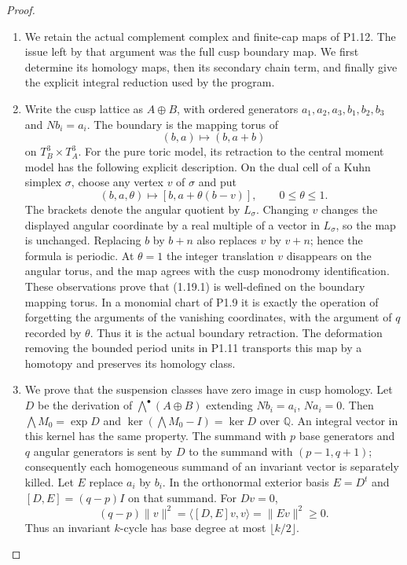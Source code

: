 \begin{proof}
\begin{enumerate}[label=\arabic*.]
\item We retain the actual complement complex and finite-cap maps of P1.12.
The issue left by that argument was the full cusp boundary map.
We first determine its homology maps, then its secondary chain term,
and finally give the explicit integral reduction used by the program.

\item Write the cusp lattice as $A\oplus B$, with ordered generators
$a_1,a_2,a_3,b_1,b_2,b_3$ and $Nb_i=a_i$.
The boundary is the mapping torus of
\[
 (b,a)\longmapsto(b,a+b)
\]
on $T_B^3\times T_A^3$.
For the pure toric model, its retraction to the central moment model
has the following explicit description.  On the dual cell of a Kuhn
simplex $\sigma$, choose any vertex $v$ of $\sigma$ and put
\[
 (b,a,\theta)\longmapsto
   [b,a+\theta(b-v)],\qquad0\leq\theta\leq1.
\tag{1.19.1}
\]
The brackets denote the angular quotient by $L_\sigma$.
Changing $v$ changes the displayed angular coordinate by a real
multiple of a vector in $L_\sigma$, so the map is unchanged.
Replacing $b$ by $b+n$ also replaces $v$ by $v+n$; hence the formula
is periodic.  At $\theta=1$ the integer translation $v$ disappears
on the angular torus, and the map agrees with the cusp monodromy
identification.  These observations prove that (1.19.1) is well-defined
on the boundary mapping torus.  In a monomial chart of P1.9 it is
exactly the operation of forgetting the arguments of the vanishing
coordinates, with the argument of $q$ recorded by $\theta$.
Thus it is the actual boundary retraction.  The deformation removing
the bounded period units in P1.11 transports this map by a homotopy
and preserves its homology class.

\item We prove that the suspension classes have zero image in cusp homology.
Let $D$ be the derivation of $\bigwedge^\bullet(A\oplus B)$ extending
$Nb_i=a_i$, $Na_i=0$.  Then $\bigwedge M_0=\exp D$ and
$\ker(\bigwedge M_0-I)=\ker D$ over $\mathbb Q$.
An integral vector in this kernel has the same property.
The summand with $p$ base generators and $q$ angular generators is
sent by $D$ to the summand with $(p-1,q+1)$; consequently each
homogeneous summand of an invariant vector is separately killed.
Let $E$ replace $a_i$ by $b_i$. In the orthonormal exterior basis
$E=D^t$ and $[D,E]=(q-p)I$ on that summand.  For $Dv=0$,
\[
 (q-p)\|v\|^2
 =\langle[D,E]v,v\rangle=\|Ev\|^2\geq0.
\]
Thus an invariant $k$-cycle has base degree at most $\lfloor k/2\rfloor$.


\end{enumerate}
\end{proof}
